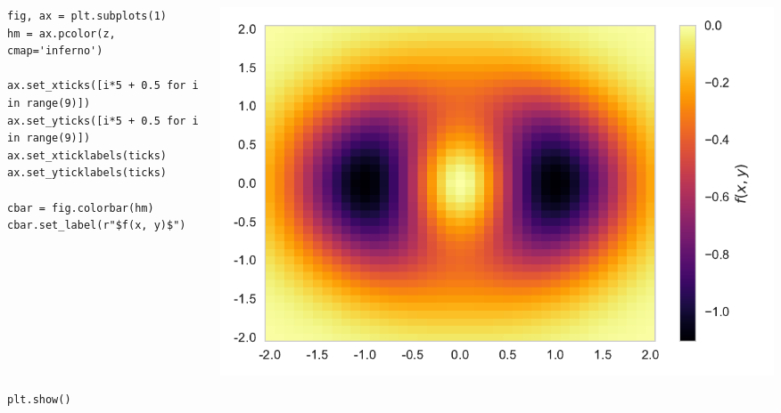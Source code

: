 \documentclass{beamer}
\begin{document}
\begin{frame}[fragile]
\tiny{
\begin{columns}
\begin{column}{0.45\textwidth}
\begin{verbatim}
fig, ax = plt.subplots(1)
hm = ax.pcolor(z, cmap='inferno')

ax.set_xticks([i*5 + 0.5 for i in range(9)])
ax.set_yticks([i*5 + 0.5 for i in range(9)])
ax.set_xticklabels(ticks)
ax.set_yticklabels(ticks)

cbar = fig.colorbar(hm)
cbar.set_label(r"$f(x, y)$")









plt.show()
\end{verbatim}
\end{column}
\begin{column}{0.55\textwidth}
\includegraphics[width=\textwidth]{heatmap_5.pdf}
\end{column}
\end{columns}
}
\end{frame}
\end{document}
